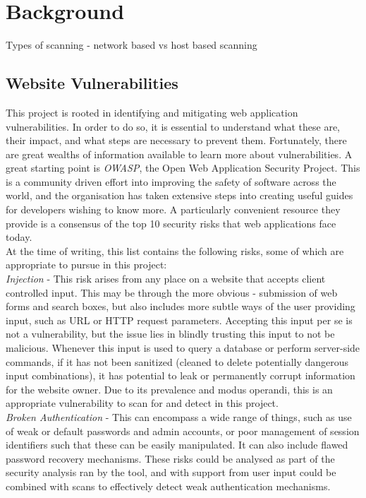 \chapter{Background}
Types of scanning - network based vs host based scanning


\section {Website Vulnerabilities}

This project is rooted in identifying and mitigating web application vulnerabilities. In order to do so, it is essential to understand what these are, their impact, and what steps are necessary to prevent them. Fortunately, there are great wealths of information available to learn more about vulnerabilities. A great starting point is \textit{OWASP}, the Open Web Application Security Project. This is a community driven effort into improving the safety of software across the world, and the organisation has taken extensive steps into creating useful guides for developers wishing to know more. A particularly convenient resource they provide is a consensus of the top 10 security risks that web applications face today. \\

At the time of writing, this list contains the following risks, some of which are appropriate to pursue in this project: \\

	\emph{Injection} - This risk arises from any place on a website that accepts client controlled input. This may be through the more obvious - submission of web forms and search boxes, but also includes more subtle ways of the user providing input, such as URL or HTTP request parameters. Accepting this input per se is not a vulnerability, but the issue lies in blindly trusting this input to not be malicious. Whenever this input is used to query a database or perform server-side commands, if it has not been sanitized (cleaned to delete potentially dangerous input combinations), it has potential to leak or permanently corrupt information for the website owner. Due to its prevalence and modus operandi, this is an appropriate vulnerability to scan for and detect in this project. \\
	
	\emph{Broken Authentication} - This can encompass a wide range of things, such as use of weak or default passwords and admin accounts, or poor management of session identifiers such that these can be easily manipulated. It can also include flawed password recovery mechanisms. These risks could be analysed as part of the security analysis ran by the tool, and with support from user input could be combined with scans to effectively detect weak authentication mechanisms. \\
	

